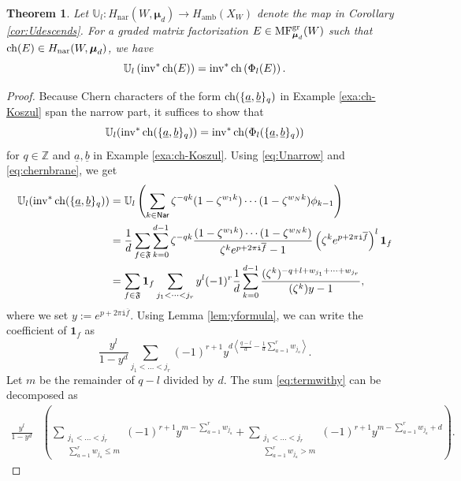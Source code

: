 \documentclass[11pt]{amsart}
\newtheorem{thm}{Theorem}[section] %
\theoremstyle{definition} %
\theoremstyle{remark} %
\newcommand{\UU}{\mathbb U}
\newcommand{\ZZ}{\mathbb Z}
\newcommand{\nar}{\operatorname{nar}}
\newcommand{\ch}{{\rm ch}}
\def\nn{N}
\def\MFhom{\operatorname{{MF}}}
\def\ol{\overline}
\def\fracp#1{\left\langle #1 \right\rangle}
\newcommand{\bmu}{\boldsymbol{\mu}}
\newcommand{\frF}{\mathfrak{F}}
\newcommand{\unit}{\boldsymbol{1}}
\newcommand{\Nar}{\operatorname{\mathsf{Nar}}}
\newcommand{\amb}{\operatorname{amb}}
\newcommand{\inv}{\operatorname{inv}}
\newcommand{\iu}{\mathtt{i}}
\newcommand{\ua}{\underline{a}}
\newcommand{\ub}{\underline{b}}
\begin{document}
\begin{thm} 
\label{thm:UisOrlov} 
Let $\UU_l\colon H_{\nar}(W,\bmu_d) \to H_{\amb}(X_W)$ denote the 
map in Corollary \ref{cor:Udescends}. 
For a graded matrix factorization $E\in \MFhom^{\rm gr}_{\bmu_d}(W)$ 
such that $\ch(E) \in H_{\nar}(W,\bmu_d)$, we have 
\[
\UU_l \left( \inv^* \ch(E)\right)  
= \inv^* \ch \left( \Phi_l (E) \right).  
\]
\end{thm}
\begin{proof}
Because Chern characters of the form $\ch(\{\ua,\ub\}_q)$ 
in Example \ref{exa:ch-Koszul} span the narrow part, 
it suffices to show that 
\[
\UU_l(\inv^*\ch(\{\ua,\ub\}_q)) =
\inv^*\ch(\Phi_l(\{\ua,\ub\}_q)) 
\]
for $q\in \ZZ$ and $\ua,\ub$ in Example \ref{exa:ch-Koszul}. 
Using \eqref{eq:Unarrow} and \eqref{eq:chernbrane}, 
we get
\begin{align*}
\UU_l(\inv^*\ch(\{\ua,\ub\}_q))
&= \UU_l 
\left(\sum_{k\in \Nar} 
\zeta^{-qk}{(1-\zeta^{w_1k})
\cdots (1-\zeta^{w_{\nn}k})}\phi_{k-1}\right)  \\
&= \frac{1}{d} \sum_{f\in \frF}\sum_{k=0}^{d-1} 
\zeta^{-qk}\frac{(1-\zeta^{w_1k})
\cdots(1-\zeta^{w_{\nn}k})}{\zeta^ke^{p+2\pi\iu \ol f}-1}
\left(\zeta^ke^{p+2\pi\iu \ol f}\right)^l{\unit_f} \\
& = \sum_{f\in \frF} \unit_f 
\sum_{j_1<\dots<j_r} y^l (-1)^r  
 \frac{1}{d} \sum_{k=0}^{d-1} 
\frac{(\zeta^k)^{-q+l+w_{j_1} + \cdots+ w_{j_r}}}
{(\zeta^k)y-1}, 
\end{align*}
where we set $y:=e^{p+2\pi\iu \ol f}$. 
Using Lemma \ref{lem:yformula}, we can write 
the coefficient of $\unit_f$ as 
\begin{equation}
\label{eq:termwithy}
\frac{y^l}{1-y^d}
\sum_{j_1<\dots<j_r} (-1)^{r+1}  
y^{d\fracp{ \frac{q-l}d-\frac{1}d 
\sum_{a=1}^r w_{j_a}}}. 
\end{equation} 
Let $m$ be the remainder of $q-l$ divided by $d$. 
The sum \eqref{eq:termwithy} can be decomposed as  
\begin{align*} 
\frac{y^l}{1-y^d} & 
\left ( 
\sum_{\substack{j_1< \dots < j_r  \\ 
\sum_{a=1}^r w_{j_a} \le m }}
(-1)^{r+1} 
y^{m - \sum_{a=1}^r w_{j_a}} 
+ 
\sum_{\substack{j_1<\dots < j_r \\ 
\sum_{a=1}^r w_{j_a} > m}} 
(-1)^{r+1} 
y^{m - \sum_{a=1}^r w_{j_a} + d} 
\right).  

\end{align*}
\end{proof}
\end{document}
